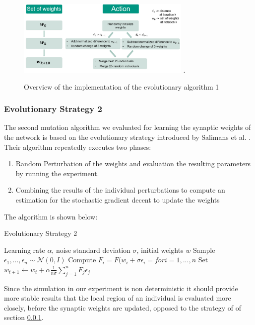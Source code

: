 \begin{figure}[H]
	\centering
	\includegraphics[width=3.3in]{img/evo_strat_1.png}
	\DeclareGraphicsExtensions.
	\caption{Overview of the implementation of the evolutionary algorithm 1}
	\label{fig:evo_strat_1}
\end{figure}

\subsubsection{Evolutionary Strategy 2}
\label{sec:strategie_2}
The second mutation algorithm we evaluated for learning the synaptic weights of the network is based on the evolutionary strategy introduced by Salimans et al. \cite{Salimans2017EvolutionSA}. Their algorithm repeatedly executes two phases:
\begin{enumerate}
	\item Random Perturbation of the weights and evaluation the resulting parameters by running the experiment.
	\item Combining the results of the individual perturbations to compute an estimation for the stochastic gradient decent to update the weights
\end{enumerate}
The algorithm is shown below: 
\begin{algorithm}
	\caption{Evolutionary Strategy 2}
	\begin{algorithmic}[1]
		\renewcommand{\algorithmicrequire}{\textbf{Input:}}
		\REQUIRE Learning rate $\alpha$, noise standard deviation $\sigma$, initial weights $w$
		\STATE Sample $\epsilon_{1},...,\epsilon_{n} \sim \mathcal{N}\left( 0, I \right)$
		\STATE Compute $F_{ i } = F(w_{ i } + \sigma \epsilon_{ i }= for i = 1, ..., n$
		\STATE Set $w_{ t+1 } \leftarrow  w_{ t }+ \alpha \frac{ 1 }{ n \sigma } \sum_{ j = 1 }^{ n }{F_{ j } \epsilon_{ j }  }$
		\ENDFOR
	\end{algorithmic} 
\end{algorithm}

Since the simulation in our experiment is non deterministic it should provide more stable results that the local region of an individual is evaluated more closely, before the synaptic weights are updated, opposed to the strategy of of section \ref{sec:strategie_2}.
